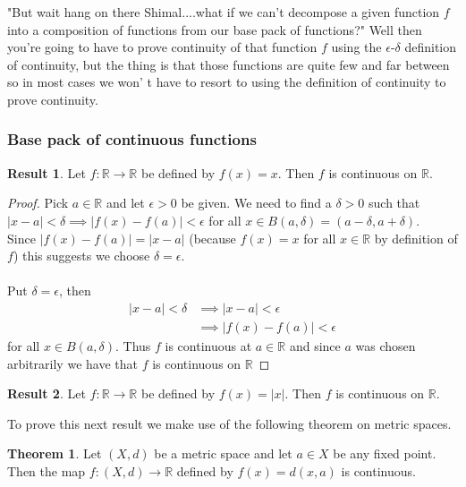 \documentclass[12pt]{article}
\theoremstyle{definition}
\numberwithin{definition}{subsection}
\newtheorem{theorem}{Theorem}
\numberwithin{theorem}{subsection}
\numberwithin{corollary}{subsection}
\newtheorem{result}{Result}
\numberwithin{example}{subsection}
\theoremstyle{remark}
\theoremstyle{point}
\begin{document}
	 "But wait hang on there Shimal....what if we can't decompose a given function $f$ into a composition of functions from our base pack of functions?" Well then you're going to have to prove continuity of that function $f$ using the $\epsilon$-$\delta$ definition of continuity, but the thing is that those functions are quite few and far between so in most cases we won' t have to resort to using the definition of continuity to prove continuity.
	 
	 \subsubsection{Base pack of continuous functions}
	 
	 \begin{result}
	 	Let $f : \mathbb{R} \to \mathbb{R}$ be defined by $f(x) = x$. Then $f$ is continuous on $\mathbb{R}$. 
	 \end{result}
	 
	 \begin{proof}
	 	Pick $a \in \mathbb{R}$ and let $\epsilon > 0$ be given. We need to find a $\delta > 0$ such that $|x-a| < \delta \implies |f(x)-f(a)| < \epsilon$ for all $x \in B(a, \delta) = (a- \delta, a+ \delta)$. \\
	 	
	 	Since $|f(x) - f(a)| = |x-a|$ (because $f(x) =  x$ for all $x \in \mathbb{R}$ by definition of $f$) this suggests we choose $\delta = \epsilon$. \\ \\
	 	Put $\delta = \epsilon$, then 	 	\begin{align*}	 	
		 	|x-a| < \delta &\implies |x-a| < \epsilon \\
		 	&\implies  |f(x) - f(a)| < \epsilon
	 	\end{align*}
	 	for all $x \in B(a, \delta)$. Thus $f$ is continuous at $a \in \mathbb{R}$ and since $a$ was chosen arbitrarily we have that $f$ is continuous on $\mathbb{R}$
	 \end{proof}
	 
	 \hrulefill
	 
	  \begin{result}
	  	Let $f : \mathbb{R} \to \mathbb{R}$ be defined by $f(x) = |x|$. Then $f$ is continuous on $\mathbb{R}$. 
	  \end{result}
	  
	  To prove this next result we make use of the following theorem on metric spaces.
	 
	 \begin{theorem}
	 	Let $(X, d)$ be a metric space and let $a \in X$ be any fixed point. Then the map $f : (X, d) \to \mathbb{R}$ defined by $f(x) = d(x, a)$ is continuous.
	 \end{theorem}
	 
\end{document}
